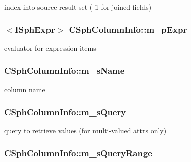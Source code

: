 index into source result set (-\/1 for joined fields) 

\hypertarget{structCSphColumnInfo_a552429a383e387ec79a70899e0444d0c}{
\subsubsection[{m\-\_\-p\-Expr}]{$<${\bf I\-Sph\-Expr}$>$ C\-Sph\-Column\-Info\-::m\-\_\-p\-Expr}}\label{structCSphColumnInfo_a552429a383e387ec79a70899e0444d0c}


evaluator for expression items 

\hypertarget{structCSphColumnInfo_ac8b08ca8f69d7bfa2dddbf080027f09e}{
\subsubsection[{m\-\_\-s\-Name}]{ C\-Sph\-Column\-Info\-::m\-\_\-s\-Name}}\label{structCSphColumnInfo_ac8b08ca8f69d7bfa2dddbf080027f09e}


column name 

\hypertarget{structCSphColumnInfo_a699eab7d433023dd1566699496006457}{
\subsubsection[{m\-\_\-s\-Query}]{ C\-Sph\-Column\-Info\-::m\-\_\-s\-Query}}\label{structCSphColumnInfo_a699eab7d433023dd1566699496006457}


query to retrieve values (for multi-\/valued attrs only) 

\hypertarget{structCSphColumnInfo_ab115d56d74ce42d937c1fd785411c00e}{
\subsubsection[{m\-\_\-s\-Query\-Range}]{ C\-Sph\-Column\-Info\-::m\-\_\-s\-Query\-Range}}\label{structCSphColumnInfo_ab115d56d74ce42d937c1fd785411c00e}



